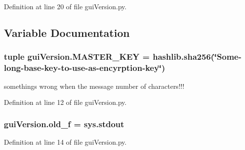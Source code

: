 Definition at line 20 of file gui\+Version.\+py.



\subsection{Variable Documentation}
\hypertarget{namespacegui_version_ad80b491a9fbc91c221e73a124bff5d05}{}
\subsubsection[{M\+A\+S\+T\+E\+R\+\_\+\+K\+E\+Y}]{\setlength{\rightskip}{0pt plus 5cm}tuple gui\+Version.\+M\+A\+S\+T\+E\+R\+\_\+\+K\+E\+Y = hashlib.\+sha256(\char`\"{}Some-\/long-\/base-\/key-\/to-\/use-\/as-\/encyrption-\/key\char`\"{})}\label{namespacegui_version_ad80b491a9fbc91c221e73a124bff5d05}


somethings wrong when the message number of characters!!! 



Definition at line 12 of file gui\+Version.\+py.

\hypertarget{namespacegui_version_a77c635f5f5d51002c89931af7228063c}{}
\subsubsection[{old\+\_\+f}]{\setlength{\rightskip}{0pt plus 5cm}gui\+Version.\+old\+\_\+f = sys.\+stdout}\label{namespacegui_version_a77c635f5f5d51002c89931af7228063c}


Definition at line 14 of file gui\+Version.\+py.

